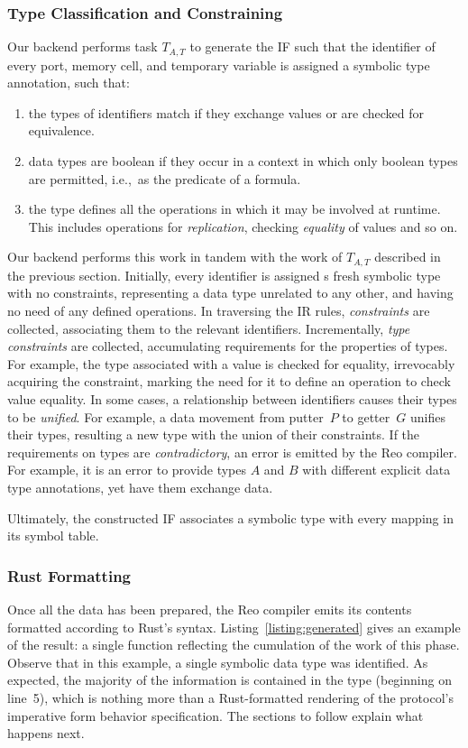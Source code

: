 \subsubsection{Type Classification and Constraining}
Our backend performs task $T_{A,T}$ to generate the IF such that the identifier of every port, memory cell, and temporary variable is assigned a symbolic type annotation, such that:
\begin{enumerate}
	\item the types of identifiers match if they exchange values or are checked for equivalence.
	\item data types are boolean if they occur in a context in which only boolean types are permitted, i.e.,\ as the predicate of a formula.
	\item the type defines all the operations in which it may be involved at runtime. This includes operations for \textit{replication}, checking \textit{equality} of values and so on.
\end{enumerate}

Our backend performs this work in tandem with the work of $T_{A,T}$ described in the previous section. Initially, every identifier is assigned s fresh symbolic type with no constraints, representing a data type unrelated to any other, and having no need of any defined operations. In traversing the IR rules, \textit{constraints} are collected, associating them to the relevant identifiers. Incrementally, \textit{type constraints} are collected, accumulating requirements for the properties of types. For example, the type associated with a value is checked for equality, irrevocably acquiring the  constraint, marking the need for it to define an operation to check value equality. In some cases, a relationship between identifiers causes their types to be \textit{unified}. For example, a data movement from putter~$P$ to getter~$G$ unifies their types, resulting a new type with the union of their constraints. If the requirements on types are \textit{contradictory}, an error is emitted by the Reo compiler. For example, it is an error to provide types $A$ and $B$ with different explicit data type annotations, yet have them exchange data.

Ultimately, the constructed IF associates a symbolic type with every mapping in its symbol table.

\subsubsection{Rust Formatting}
Once all the data has been prepared, the Reo compiler emits its contents formatted according to Rust's syntax. Listing~\ref{listing:generated} gives an example of the result: a single  function reflecting the cumulation of the work of this phase. Observe that in this example, a single symbolic data type  was identified. As expected, the majority of the information is contained in the  type (beginning on line~5), which is nothing more than a Rust-formatted rendering of the protocol's imperative form behavior specification. The sections to follow explain what happens next.

